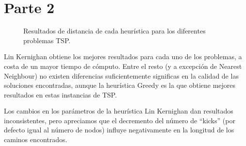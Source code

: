 \documentclass[13pt,a4paper]{article}
\begin{document}
\newpage

\section{Parte 2}

\begin{figure}[H]
    \centering
    \caption{Resultados de distancia de cada heurística para los diferentes problemas TSP.}
\end{figure}

Lin Kernighan obtiene los mejores resultados para cada uno de los problemas, a costa de un mayor tiempo de cómputo. Entre el resto (y a excepción de Nearest Neighbour) no existen diferencias suficientemente significas en la calidad de las soluciones encontradas, aunque la heurística Greedy es la que obtiene mejores resultados en estas instancias de TSP.

\vspace{\baselineskip}

Los cambios en los parámetros de la heurística Lin Kernighan dan resultados inconsistentes, pero apreciamos que el decremento del número de ``kicks'' (por defecto igual al número de nodos) influye negativamente en la longitud de los caminos encontrados.
\end{document}
